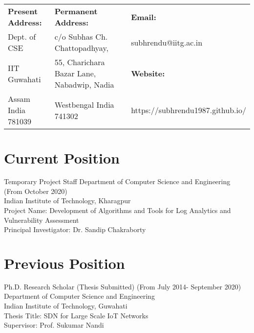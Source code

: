 \documentclass{article}
\begin{document}
 
\begin{center}
	\Large{\bf \name}
\end{center}
%                                  
	\begin{table}[h]
	\centering
	\begin{tabular}{|lll|}
	\hline
	{\bf Present Address:}    & {\bf Permanent Address:}        					&	{\bf Email:}               \\
	Dept. of CSE       				& c/o Subhas Ch. Chattopadhyay, 					&	subhrendu@iitg.ac.in         \\
	IIT Guwahati       			& 55, Charichara Bazar Lane, Nabadwip, Nadia  &	{\bf Website:}  \\
	Assam India 781039 		& Westbengal  India 741302 							&	https://subhrendu1987.github.io/ \\ \hline
	\end{tabular}
	\end{table}
 \noindent\makebox[\linewidth]{\rule{\textwidth}{0.4pt}}
\section{Current Position}          
Temporary 	Project Staff
Department of Computer Science and Engineering (From October 2020)\\
Indian Institute of Technology, Kharagpur\\
Project Name: Development of Algorithms and Tools for Log Analytics  and Vulnerability Assessment \\
Principal Investigator: Dr. Sandip Chakraborty
\section{Previous Position}
	Ph.D. Research Scholar (Thesis Submitted)  (From July 2014- September 2020)\\
    Department of Computer Science and Engineering\\
    Indian Institute of Technology, Guwahati\\
    Thesis Title: SDN for Large Scale IoT Networks\\
    Supervisor: Prof. Sukumar Nandi
\end{document}
